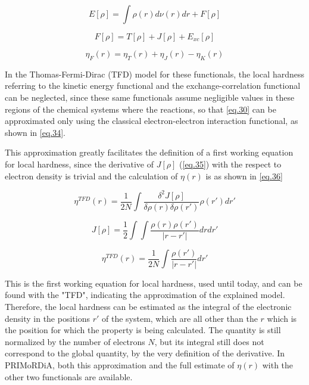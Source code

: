 \documentclass[a4paper,11pt]{refart}
\begin{document}
	\begin{equation}
	E[\rho] = \int \rho(r) d \nu (r) dr + F[\rho]
	\label{eq.31}
	\end{equation}

	\begin{equation}
	F[\rho] = T[\rho] + J[\rho] + E_{xc}[\rho]
	\label{eq.32}
	\end{equation}

	\begin{equation}
	\eta_{F} (r) = \eta_{T}(r)+ \eta_{J}(r) - \eta_{K}(r)
	\label{eq.33}
	\end{equation}

	In the Thomas-Fermi-Dirac (TFD) model for these functionals, the local hardness referring to the kinetic energy functional and the exchange-correlation functional can be neglected, since these same functionals assume negligible values in these regions of the chemical systems where the reactions, so that \autoref{eq.30} can be approximated only using the classical electron-electron interaction functional, as shown in \autoref{eq.34}. 

	This approximation greatly facilitates the definition of a first working equation for local hardness, since the derivative of $J[\rho]$ (\autoref{eq.35})  with the respect to electron density is trivial and the calculation of $\eta(r)$ is as shown in \autoref{eq.36}

	\begin{equation}
	\eta^{TFD} (r) = \frac{1}{2N} \int \frac{\delta^2 J[\rho]}{\delta \rho(r) \delta \rho(r')} \rho(r')dr'
	\label{eq.34}
	\end{equation}

	\begin{equation}
	J[\rho] = \frac{1}{2} \int \int \frac{\rho(r) \rho(r')}{|r-r'|} dr dr'
	\label{eq.35}
	\end{equation}

	\begin{equation}
	\eta^{TFD} (r) = \frac{1}{2N} \int \frac{\rho(r')}{|r-r'|} dr'
	\label{eq.36}
	\end{equation}

	This is the first working equation for local hardness, used until today, and can be found with the "TFD", indicating the approximation of the explained model. Therefore, the local hardness can be estimated as the integral of the electronic density in the positions $r'$ of the system, which are all other than the $r$ which is the position for which the property is being calculated. The quantity is still normalized by the number of electrons $N$, but its integral still does not correspond to the global quantity, by the very definition of the derivative. In PRIMoRDiA, both this approximation and the full estimate of $\eta(r)$ with the other two functionals are available.
\end{document}
